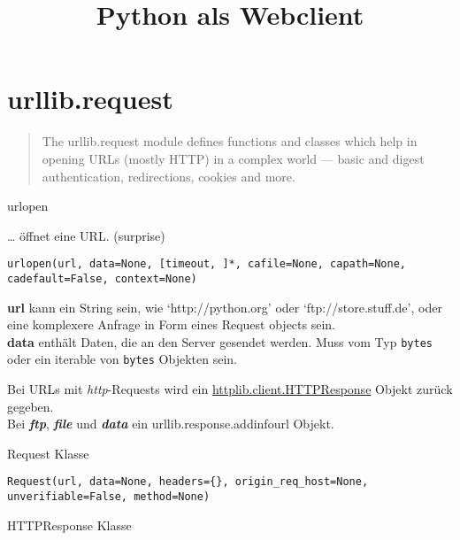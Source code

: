\documentclass[ignorenonframetext,]{beamer}
\title{Python als Webclient}
\date{}
\begin{document}
\frame{\titlepage}

\section{urllib.request}\label{urllib.request}

\begin{frame}

\begin{quote}
The urllib.request module defines functions and classes which help in
opening URLs (mostly HTTP) in a complex world --- basic and digest
authentication, redirections, cookies and more.
\end{quote}

\end{frame}

\begin{frame}[fragile]{urlopen}

\ldots{} öffnet eine URL. (surprise)

\begin{verbatim}
urlopen(url, data=None, [timeout, ]*, cafile=None, capath=None, cadefault=False, context=None)
\end{verbatim}

\textbf{url} kann ein String sein, wie `http://python.org' oder
`ftp://store.stuff.de', oder eine komplexere Anfrage in Form eines
Request objects sein.\\\textbf{data} enthält Daten, die an den Server
gesendet werden. Muss vom Typ \texttt{bytes} oder ein iterable von
\texttt{bytes} Objekten sein.

Bei URLs mit \emph{http}-Requests wird ein
\hyperref[httpresponse-class]{httplib.client.HTTPResponse} Objekt zurück
gegeben.\\Bei \emph{\textbf{ftp}}, \emph{\textbf{file}} und
\emph{\textbf{data}} ein urllib.response.addinfourl Objekt.

\end{frame}

\begin{frame}[fragile]{Request Klasse}

\begin{verbatim}
Request(url, data=None, headers={}, origin_req_host=None, unverifiable=False, method=None)
\end{verbatim}

\end{frame}

\begin{frame}{HTTPResponse Klasse}

\end{frame}
\end{document}

